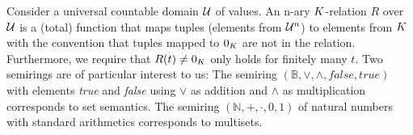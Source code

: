 
%

Consider a universal countable domain $\mathcal{U}$
of values. %
An n-ary $K$-relation $R$ over $\mathcal{U}$ is a
(total) function that maps tuples
 (elements from $\mathcal{U}^n$)
to elements from $K$ with the convention that tuples mapped to
$0_K$ are not in the
relation. Furthermore, we require that $R(t) \neq 0_{K}$ only
holds for finitely many $t$.  Two semirings are of particular interest
to
us: %
%
The semiring $(\mathbb{B}, \vee, \wedge, false, true)$ with elements \textit{true} and \textit{false} using
$\vee$ as addition and $\wedge$ as multiplication corresponds to set semantics.
The semiring $(\mathbb{N}, +, \cdot, 0, 1)$ of natural numbers with standard arithmetics
corresponds to multisets. %

